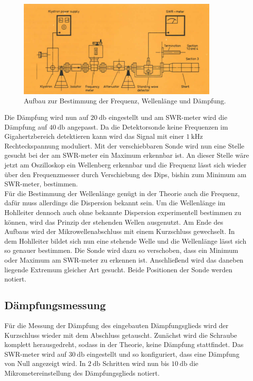 \begin{figure}
    \centering
    \includegraphics[width=0.9\textwidth]{bilder/aufbau2.png}
    \caption{Aufbau zur Bestimmung der Frequenz, Wellenlänge und Dämpfung. \cite{skript}} 
    \label{fig:2}
\end{figure}
Die Dämpfung wird nun auf $\SI{20}{\decibel}$ eingestellt und am SWR-meter wird die Dämpfung auf $\SI{40}{\decibel}$ angepasst. Da die Detektorsonde keine Frequenzen im Gigahertzbereich detektieren kann wird das Signal mit einer $\SI{1}{\kilo\hertz}$ Rechteckspannung
moduliert. Mit der verschiebbaren Sonde wird nun eine Stelle gesucht bei der am SWR-meter ein Maximum erkennbar ist. An dieser Stelle wäre jetzt am Oszilloskop ein Wellenberg erkennbar und die Frequenz lässt sich wieder über den Frequenzmesser
durch Verschiebung des Dips, bishin zum Minimum am SWR-meter, bestimmen.
\\
\newline
Für die Bestimmung der Wellenlänge genügt in der Theorie auch die Frequenz, dafür muss allerdings die Dispersion bekannt sein. Um die Wellenlänge im Hohlleiter dennoch auch ohne bekannte Dispersion
experimentell bestimmen zu können, wird das Prinzip der stehenden Wellen ausgenutzt. Am Ende des Aufbaus wird der Mikrowellenabschluss mit einem Kurzschluss gewechselt. In dem Hohlleiter bildet sich nun eine stehende Welle
und die Wellenlänge lässt sich so genauer bestimmen.
Die Sonde wird dazu so verschoben, dass ein Minimum oder Maximum am SWR-meter zu erkennen ist. Anschließend wird das daneben liegende Extremum gleicher Art gesucht. Beide Positionen der Sonde werden notiert.

\subsection{Dämpfungsmessung}
Für die Messung der Dämpfung des eingebauten Dämpfungsglieds wird der Kurzschluss wieder mit dem Abschluss getauscht. Zunächst wird die Schraube komplett herausgedreht, sodass in der Theorie, keine Dämpfung stattfindet. Das SWR-meter wird auf 
$\SI{30}{\decibel}$ eingestellt und
so konfiguriert, dass eine Dämpfung von Null angezeigt wird. In $\SI{2}{\decibel}$ Schritten wird nun bis $\SI{10}{\decibel}$ die Mikrometereinstellung des Dämpfungsglieds notiert.

